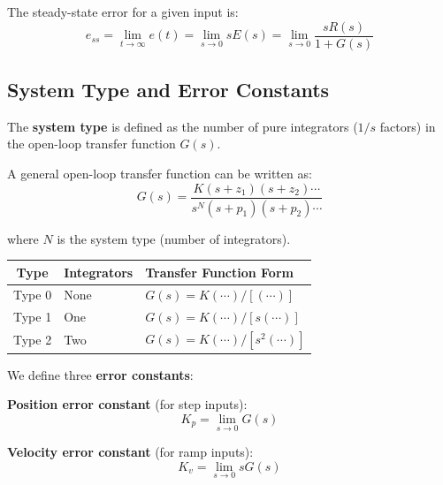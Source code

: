 The steady-state error for a given input is:
\begin{equation}
    e_{ss} = \lim_{t\to\infty} e(t) = \lim_{s\to 0} sE(s) = \lim_{s\to 0} \frac{sR(s)}{1 + G(s)}
    \label{eq:ess_general}
\end{equation}

\subsection{System Type and Error Constants}

The \textbf{system type} is defined as the number of pure integrators ($1/s$ factors) in the open-loop transfer function $G(s)$.

A general open-loop transfer function can be written as:
\begin{equation}
    G(s) = \frac{K(s+z_1)(s+z_2)\cdots}{s^N(s+p_1)(s+p_2)\cdots}
\end{equation}

where $N$ is the system type (number of integrators).

\begin{keyconceptbox}
\begin{center}
\begin{tabular}{cll}
\toprule
\textbf{Type} & \textbf{Integrators} & \textbf{Transfer Function Form} \\
\midrule
Type 0 & None & $G(s) = K(\cdots)/[(\cdots)]$ \\
Type 1 & One & $G(s) = K(\cdots)/[s(\cdots)]$ \\
Type 2 & Two & $G(s) = K(\cdots)/[s^2(\cdots)]$ \\
\bottomrule
\end{tabular}
\end{center}
\end{keyconceptbox}

We define three \textbf{error constants}:

\textbf{Position error constant} (for step inputs):
\begin{equation}
    \boxed{K_p = \lim_{s\to 0} G(s)}
    \label{eq:Kp}
\end{equation}

\textbf{Velocity error constant} (for ramp inputs):
\begin{equation}
    \boxed{K_v = \lim_{s\to 0} sG(s)}
    \label{eq:Kv}
\end{equation}

